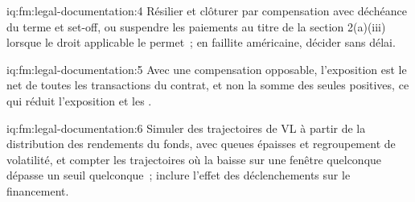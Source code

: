 \begin{solution}{iq:fm:legal-documentation:4}
Résilier et clôturer par compensation avec déchéance du terme et set-off, ou suspendre les paiements au titre de la section 2(a)(iii) lorsque le droit applicable le permet~; en faillite américaine,
décider sans délai.
\end{solution}

\begin{solution}{iq:fm:legal-documentation:5}
Avec une compensation opposable, l'exposition est le net de toutes les transactions du contrat, et non la somme des seules positives, ce qui réduit l'exposition et
les .
\end{solution}

\begin{solution}{iq:fm:legal-documentation:6}
Simuler des trajectoires de VL à partir de la distribution des rendements du fonds, avec queues épaisses et regroupement de volatilité, et compter les trajectoires où la baisse sur une fenêtre
quelconque dépasse un seuil quelconque~; inclure l'effet des déclenchements sur le financement.
\end{solution}
